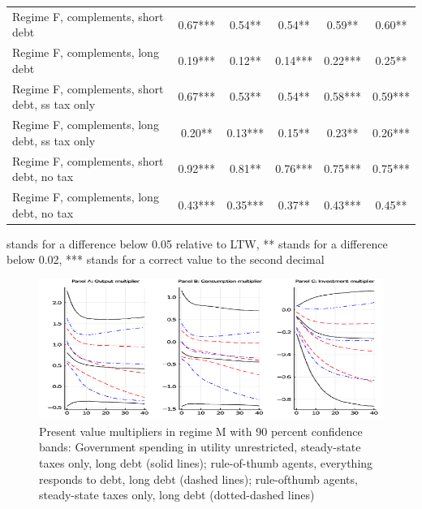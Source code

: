 \documentclass[letterpaper,12pt]{article}%
\begin{document}
\begin{table}[H]
\begin{threeparttable}
\begin{tabular}{l c c c c c}
     \quad Regime F, complements, short debt &  0.67*** & 0.54**  &  0.54** & 0.59** & 0.60**  \\
     \quad Regime F, complements, long debt &   0.19*** & 0.12** & 0.14*** & 0.22***  & 0.25** \\
     \quad Regime F, complements, short debt, ss tax only &  0.67*** & 0.53** & 0.54**  & 0.58*** & 0.59*** \\
     \quad Regime F, complements, long debt, ss tax only &  0.20**  & 0.13*** & 0.15**  & 0.23**  &  0.26*** \\
     \quad Regime F, complements, short debt, no tax &  0.92*** & 0.81**   & 0.76***  & 0.75***  & 0.75*** \\
     \quad Regime F, complements, long debt, no tax &   0.43*** & 0.35*** & 0.37**  & 0.43*** & 0.45** \\
    \bottomrule    
    \end{tabular}
    \begin{tablenotes}
    \item * stands for a difference below 0.05 relative to LTW, ** stands for a difference below 0.02, *** stands for a correct value to the second decimal
    \end{tablenotes}
    \label{tab:my_label}
    \end{threeparttable}
\end{table}

\begin{figure}[H]
    \centering
    \includegraphics[width=12cm]{figure1.png}
    \caption{Present value multipliers in regime M with 90 percent confidence bands: Government spending in utility unrestricted, steady-state taxes
only, long debt (solid lines); rule-of-thumb agents, everything responds to debt, long debt (dashed lines); rule-ofthumb
agents, steady-state taxes only, long debt (dotted-dashed lines) }
    \label{fig:my_label}
\end{figure}
\end{document}
